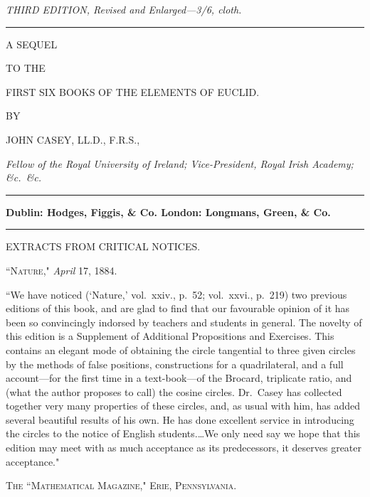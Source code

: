 \documentclass[oneside]{book}
\begin{document}
\newpage
\begin{center}
\textit{\textsf{THIRD EDITION, Revised and Enlarged---3/6, cloth.}}

\rule[1ex]{1cm}{1pt}
\bigskip

{\LARGE \textsf{A SEQUEL}}

\medskip
{\tiny TO THE}

\medskip
{\large FIRST SIX BOOKS OF THE ELEMENTS
OF EUCLID.}
\bigskip

{\footnotesize BY}

\bigskip
{\Large JOHN CASEY, LL\@.D., F.R.S.,}

\medskip
\textit{\textsf{Fellow of the Royal University of Ireland; Vice-President, Royal
Irish Academy; \&c.\ \&c.}}
\bigskip

\rule[1ex]{3cm}{1pt}

\textbf{Dublin: Hodges, Figgis, \& Co.\quad
London: Longmans, Green, \& Co.}

\medskip
\rule[1ex]{3cm}{1pt}
\bigskip

{\large \textsf{EXTRACTS FROM CRITICAL NOTICES.}}

\medskip
``\textsc{Nature}," \textit{April} 17, 1884.
\end{center}
\nopagebreak

\begin{footnotesize}
``We have noticed (`Nature,' vol.~xxiv., p.~52; vol.~xxvi.,
p.~219) two previous editions of this book, and are glad to find
that our favourable opinion of it has been so convincingly indorsed
by teachers and students in general. The novelty of this
edition is a Supplement of Additional Propositions and Exercises.
This contains an elegant mode of obtaining the circle tangential
to three given circles by the methods of false positions, constructions
for a quadrilateral, and a full account---for the first time in
a text-book---of the Brocard, triplicate ratio, and (what the author
proposes to call) the cosine circles. Dr.~Casey has collected together
very many properties of these circles, and, as usual with
him, has added several beautiful results of his own. He has
done excellent service in introducing the circles to the notice of
English students.\ldots We only need say we hope that this
edition may meet with as much acceptance as its predecessors,
it deserves greater acceptance."
\end{footnotesize}

\bigskip
\begin{center}
\textsc{The ``Mathematical Magazine," Erie, Pennsylvania.}
\end{center}
\nopagebreak
\end{document}
